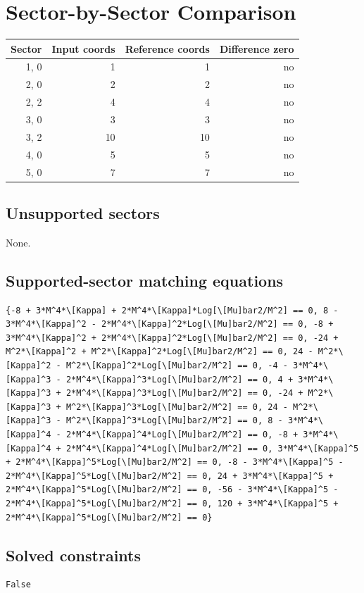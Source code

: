 \documentclass[11pt]{article}
\begin{document}
\section{Sector-by-Sector Comparison}
\begin{longtable}{rrrr}
\toprule
Sector & Input coords & Reference coords & Difference zero \\
\midrule
{1, 0} & 1 & 1 & no \\
{2, 0} & 2 & 2 & no \\
{2, 2} & 4 & 4 & no \\
{3, 0} & 3 & 3 & no \\
{3, 2} & 10 & 10 & no \\
{4, 0} & 5 & 5 & no \\
{5, 0} & 7 & 7 & no \\
\bottomrule
\end{longtable}
\subsection{Unsupported sectors}
None.
\subsection{Supported-sector matching equations}
\begin{verbatim}
{-8 + 3*M^4*\[Kappa] + 2*M^4*\[Kappa]*Log[\[Mu]bar2/M^2] == 0, 8 - 3*M^4*\[Kappa]^2 - 2*M^4*\[Kappa]^2*Log[\[Mu]bar2/M^2] == 0, -8 + 3*M^4*\[Kappa]^2 + 2*M^4*\[Kappa]^2*Log[\[Mu]bar2/M^2] == 0, -24 + M^2*\[Kappa]^2 + M^2*\[Kappa]^2*Log[\[Mu]bar2/M^2] == 0, 24 - M^2*\[Kappa]^2 - M^2*\[Kappa]^2*Log[\[Mu]bar2/M^2] == 0, -4 - 3*M^4*\[Kappa]^3 - 2*M^4*\[Kappa]^3*Log[\[Mu]bar2/M^2] == 0, 4 + 3*M^4*\[Kappa]^3 + 2*M^4*\[Kappa]^3*Log[\[Mu]bar2/M^2] == 0, -24 + M^2*\[Kappa]^3 + M^2*\[Kappa]^3*Log[\[Mu]bar2/M^2] == 0, 24 - M^2*\[Kappa]^3 - M^2*\[Kappa]^3*Log[\[Mu]bar2/M^2] == 0, 8 - 3*M^4*\[Kappa]^4 - 2*M^4*\[Kappa]^4*Log[\[Mu]bar2/M^2] == 0, -8 + 3*M^4*\[Kappa]^4 + 2*M^4*\[Kappa]^4*Log[\[Mu]bar2/M^2] == 0, 3*M^4*\[Kappa]^5 + 2*M^4*\[Kappa]^5*Log[\[Mu]bar2/M^2] == 0, -8 - 3*M^4*\[Kappa]^5 - 2*M^4*\[Kappa]^5*Log[\[Mu]bar2/M^2] == 0, 24 + 3*M^4*\[Kappa]^5 + 2*M^4*\[Kappa]^5*Log[\[Mu]bar2/M^2] == 0, -56 - 3*M^4*\[Kappa]^5 - 2*M^4*\[Kappa]^5*Log[\[Mu]bar2/M^2] == 0, 120 + 3*M^4*\[Kappa]^5 + 2*M^4*\[Kappa]^5*Log[\[Mu]bar2/M^2] == 0}
\end{verbatim}
\subsection{Solved constraints}
\begin{verbatim}
False
\end{verbatim}
\end{document}
